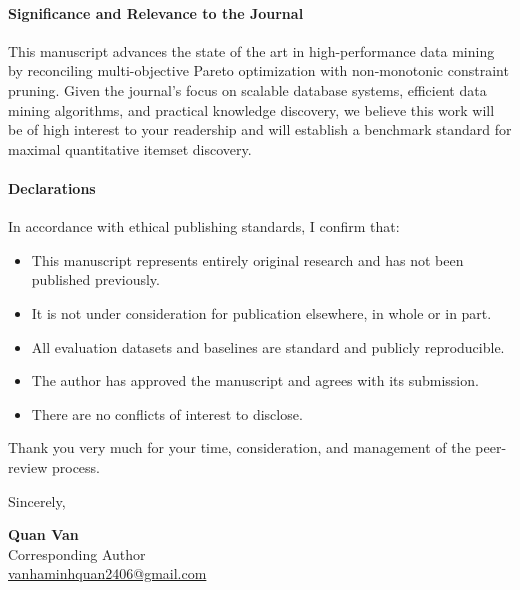 \documentclass[11pt,a4paper]{article}
\begin{document}
\paragraph{Significance and Relevance to the Journal}
This manuscript advances the state of the art in high-performance data mining by reconciling multi-objective Pareto optimization with non-monotonic constraint pruning. Given the journal's focus on scalable database systems, efficient data mining algorithms, and practical knowledge discovery, we believe this work will be of high interest to your readership and will establish a benchmark standard for maximal quantitative itemset discovery.

\paragraph{Declarations}
In accordance with ethical publishing standards, I confirm that:
\begin{itemize}
    \item This manuscript represents entirely original research and has not been published previously.
    \item It is not under consideration for publication elsewhere, in whole or in part.
    \item All evaluation datasets and baselines are standard and publicly reproducible.
    \item The author has approved the manuscript and agrees with its submission.
    \item There are no conflicts of interest to disclose.
\end{itemize}

Thank you very much for your time, consideration, and management of the peer-review process.

\vspace{1.5em}

Sincerely,

\vspace{0.8em}
\textbf{Quan Van} \\
Corresponding Author \\
\href{mailto:vanhaminhquan2406@gmail.com}{vanhaminhquan2406@gmail.com}
\end{document}
